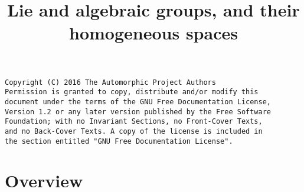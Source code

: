 

%


\title{Lie and algebraic groups, and their homogeneous spaces}


\maketitle

\label{section-phantom}

\begin{verbatim}
Copyright (C) 2016 The Automorphic Project Authors
Permission is granted to copy, distribute and/or modify this
document under the terms of the GNU Free Documentation License,
Version 1.2 or any later version published by the Free Software
Foundation; with no Invariant Sections, no Front-Cover Texts,
and no Back-Cover Texts. A copy of the license is included in
the section entitled "GNU Free Documentation License".
\end{verbatim}

\tableofcontents


\section{Overview}
\label{section-overview}

\noindent









